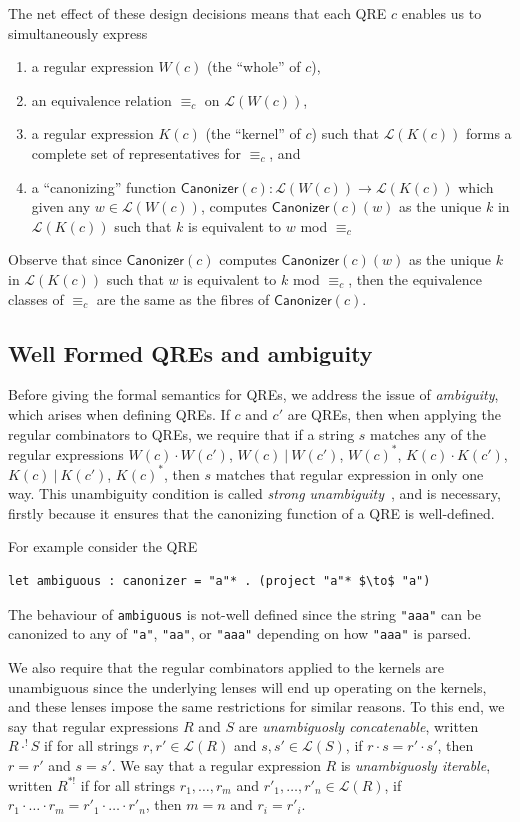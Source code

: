 \documentclass[acmsmall,review,anonymous]{acmart}\settopmatter{printfolios=true,printccs=false,printacmref=false}
\newcommand{\kw}[1]{\ensuremath{\mathsf{#1}}}
\newcommand{\sep}{\ensuremath{\ | \ }}
\newcommand{\canonizer}{\ensuremath{\kw{Canonizer}}}
\newcommand{\eqrel}[1]{\ensuremath{\equiv_{#1}}}
\newcommand{\cd}[1]{\lstinline[backgroundcolor=\color{white}]$#1$}
\begin{document}
The net effect of these design decisions means that each QRE $c$ enables
us to simultaneously express
\begin{enumerate}
  \item a regular expression $W(c)$ (the ``whole'' of $c$),
  \item an equivalence relation $\eqrel{c}$ on $\mathcal{L}(W(c))$,
  \item a regular expression $K(c)$ (the ``kernel'' of $c$)
  such that $\mathcal{L}(K(c))$ forms a complete set of representatives for
  $\eqrel{c}$, and
  \item a ``canonizing'' function $\canonizer(c):\mathcal{L}(W(c))
  \longrightarrow \mathcal{L}(K(c))$ which given any $w \in \mathcal{L}(W(c))$,
  computes $\canonizer(c)(w)$ as the unique $k$ in $\mathcal{L}(K(c))$ such that
  $k$ is equivalent to $w$ mod $\eqrel{c}$
\end{enumerate}
Observe that since $\canonizer(c)$ computes $\canonizer(c)(w)$ as the unique
$k$ in $\mathcal{L}(K(c))$ such that $w$ is equivalent to $k$ mod $\eqrel{c}$,
then the equivalence classes of $\eqrel{c}$ are the same as the fibres of
$\canonizer(c)$.

\subsection{Well Formed QREs and ambiguity}
Before giving the formal semantics for QREs, we address the issue of {\em
ambiguity}, which arises when defining QREs. If $c$ and  $c'$ are QREs, then
when applying the regular combinators to QREs, we require that if a string $s$
matches any of the regular expressions $W(c) \cdot W(c')$, $W(c) \sep W(c')$,
$W(c)^*$, $K(c) \cdot K(c')$, $K(c) \sep K(c')$, $K(c)^*$, then $s$ matches
that regular expression in only one way. This unambiguity condition is called
{\em strong unambiguity}~\cite{Sippu1988}, and is necessary, firstly because it
ensures that the canonizing function of a QRE is well-defined.

For example consider the QRE

\begin{lstlisting}
let ambiguous : canonizer = "a"* . (project "a"* $\to$ "a")
\end{lstlisting}

\noindent The behaviour of \cd{ambiguous} is not-well defined since the string
\cd{"aaa"} can be canonized to any of \cd{"a"}, \cd{"aa"}, or \cd{"aaa"} depending on how
\cd{"aaa"} is parsed.

We also require that the regular combinators applied to
the kernels are unambiguous since the underlying lenses will end up operating
on the kernels, and these lenses impose the same restrictions for similar
reasons.
%
To this end, we say that regular expressions $R$ and $S$ are
\textit{unambiguosly concatenable}, written $R \cdot^! S$ if for all strings
$r, r' \in \mathcal{L}(R)$ and $s, s' \in \mathcal{L}(S)$, if $r \cdot s = r'
\cdot s'$, then $r = r'$ and $s = s'$. We say that a regular expression $R$ is
\textit{unambiguosly iterable}, written $R^{*!}$ if for all strings $r_1,
\ldots, r_m$ and $r'_1, \ldots, r'_n \in \mathcal{L}(R)$, if $r_1 \cdot \ldots
\cdot r_m = r'_1 \cdot \ldots \cdot r'_n$, then $m = n$ and $r_i = r'_i$.
\end{document}
